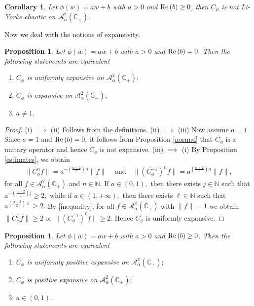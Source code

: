\documentclass[11pt]{amsart}%
\numberwithin{equation}{section}
\theoremstyle{plain}
\newtheorem{cor}[thm]{Corollary}
\newtheorem{prop}[thm]{Proposition}
\theoremstyle{definition}
\theoremstyle{definition}
\newcommand{\re}{{\rm Re}\,}
\newcommand{\hb}{\mathbb{C}_+}
\newcommand{\Ber}{\mathcal{A}^2_{\alpha}(\hb)}
\begin{document}
\begin{cor}
Let $\phi(w)=a w+b$ with $a >0$ and $\re(b)\geq0$, then $C_{\phi}$ is not Li-Yorke chaotic on $\Ber.$
\end{cor}
Now we deal with the notions of expansivity.

\begin{prop}\label{uniformly expansive}
Let $\phi(w)=a w+b$ with $a >0$ and $\re(b)=0.$ Then the following statements are equivalent
\begin{enumerate}[label=\textnormal{(\roman*)}]
\item $C_{\phi}$ is uniformly expansive on $\Ber;$
\item  $C_{\phi}$ is expansive on $\Ber;$
\item $a\neq 1.$
\end{enumerate}
\end{prop}

\begin{proof}
(i) $\implies$ (ii) Follows from the definitions. (ii) $\implies$ (iii) Now assume $a=1.$ Since $a=1$ and $\re(b)=0,$ it follows from Proposition \ref{normal} that $C_{\phi}$ is a unitary operator and hence $C_{\phi}$ is not expansive. (iii) $\implies$ (i) By Proposition \ref{estimates}, we  obtain
\begin{align}\label{inequality}
\|C_{\phi}^nf\|=a ^{-\left(\frac{\alpha+2}{2}\right)n}\|f\| \ \quad \text{and} \quad \|(C_{\phi}^{-1})^nf\|=a ^{\left(\frac{\alpha+2}{2}\right)n} \|f\|,
\end{align}
for all $f\in \Ber$ and $n\in \mathbb{N}.$ If $a\in (0,1),$ then there exists $j\in \mathbb{N}$ such that $a ^{-\left(\frac{\alpha+2}{2}\right)j} \geq 2,$ while if $a \in (1, +\infty),$ then there exists $\ell\in \mathbb{N}$ such that $a ^{\left(\frac{\alpha+2}{2}\right)\ell} \geq 2.$  By \eqref{inequality}, for all $f\in \Ber$ with $\|f\|=1$ we obtain $\|C_{\phi}^jf\|\geq 2$ or $\|(C_{\phi}^{-1})^{\ell}f\|\geq 2.$ Hence $C_{\phi}$ is uniformly expansive. 
\end{proof}


\begin{prop}\label{uniformly positive expansive}
Let $\phi(w) = a w+b$ with $a >0$ and $\re(b) \geq 0$. Then the following statements are equivalent
\begin{enumerate}[label=\textnormal{(\roman*)}]
\item $C_{\phi}$ is uniformly positive expansive on $\Ber;$
\item  $C_{\phi}$ is positive expansive on $\Ber;$
\item $a\in (0,1).$
\end{enumerate}
\end{prop}
\end{document}
